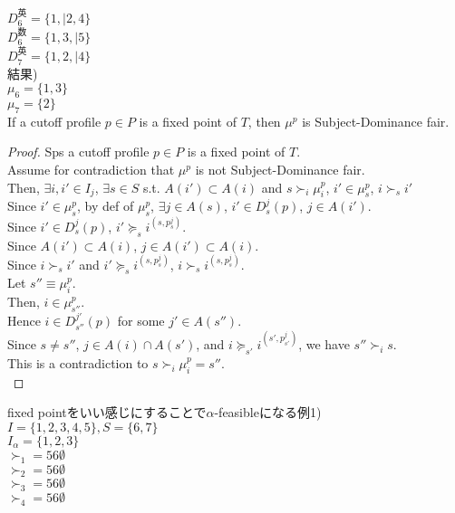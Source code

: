 \documentclass[a4j,10pt]{jsarticle}
\theoremstyle{definition}
\theoremstyle{remark}
\theoremstyle{plain}
\begin{document}
\begin{tcolorbox}[enhanced,breakable=true]
$D_6^{\text{英}} = \{1,|2,4\}$\\
$D_6^{\text{数}} = \{1,3,|5\}$\\
$D_7^{\text{英}} = \{1,2,|4\}$\\


結果)\\
$\mu_6 = \{1,3\}$\\
$\mu_7 = \{2\}$\\


If a cutoff profile \( p \in P\) is a fixed point of \( T \), then \( \mu^{p} \) is Subject-Dominance fair.\\


\begin{proof}
  Sps a cutoff profile \( p \in P\) is a fixed point of \( T \).\\
  Assume for contradiction that \( \mu^{p} \) is not Subject-Dominance fair.\\
  Then, $\exists i,i' \in I_j$, $\exists s \in S $ s.t. $A(i')\subset A(i)$ and $s \succ_i \mu_i^p$, $i' \in \mu_s^p$, $i \succ_s i'$\\
  Since $i' \in  \mu^{p}_s$, by def of $\mu^{p}_s$, $\exists j \in A(s)$, $i' \in D_s^j(p)$, $j \in A(i')$.\\
  Since $i' \in D_s^j(p)$, $i' \succeq_s i^{(s,p_s^j)}$.\\ 
  Since $A(i')\subset A(i)$, $j \in A(i') \subset A(i)$.\\
  Since $i \succ_s i'$ and $i' \succeq_s i^{(s,p_s^j)}$, $i \succ_s i^{(s,p_s^j)}$.\\
  Let $s'' \equiv \mu_i^p$.\\
  Then, $i \in \mu_{s''}^p$.\\ 
  Hence $i \in D_{s''}^{j'}(p)$ for some $j' \in A(s'')$.\\
  Since $s \neq s''$, $j \in A(i) \cap A(s')$, and $i \succeq_{s'} i^{(s',p_{s'}^j)}$, we have $s'' \succ_i s$.\\
  This is a contradiction to $s \succ_i \mu_i^p = s''$.\\
\end{proof}


fixed pointをいい感じにすることで$\alpha$-feasibleになる例1)\\
$I = \{1,2,3,4,5\}, S = \{6,7\}$\\
$I_\alpha = \{1,2,3\}$\\
$\succ_1 = 56\emptyset$\\
$\succ_2 = 56\emptyset$\\
$\succ_3 = 56\emptyset$\\
$\succ_4 = 56\emptyset$\\


\end{tcolorbox}
\end{document}
